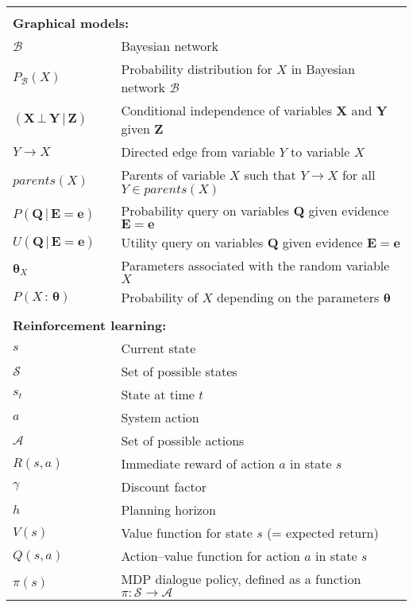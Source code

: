 \begin{longtable}{lp{5mm}p{11cm}}
&&  \vspace{0mm} \\
\multicolumn{3}{l}{\textbf{Graphical models:}} \vspace{2mm} \\
 $\mathcal{B}$ && Bayesian network \\
 $P_\mathcal{B}(X)$ && Probability distribution for $X$ in Bayesian network $\mathcal{B}$ \\ 
$(\mathbf{X} \, \bot \, \mathbf{Y} \, | \, \mathbf{Z})$ && Conditional independence of variables $\mathbf{X} $ and $\mathbf{Y}$ given $\mathbf{Z}$ \\
$Y \rightarrow X$ && Directed edge from variable $Y$ to variable $X$ \\
$parents(X)$ && Parents of variable $X$ such that $Y \rightarrow X$ for all $Y\!\in\!parents(X)$ \\
 $P(\mathbf{Q}  \, | \,  \mathbf{E}\!=\!\mathbf{e})$ && Probability query on variables $\mathbf{Q}$ given evidence $\mathbf{E}\!=\!\mathbf{e}$ \\ 
 $U(\mathbf{Q}  \, | \,  \mathbf{E}\!=\!\mathbf{e})$ && Utility query on variables $\mathbf{Q}$ given evidence $\mathbf{E}\!=\!\mathbf{e}$ \\ 
 $\boldsymbol\theta_{X}$ && Parameters associated with the random variable $X$ \\ 
 $P(X \, : \, \boldsymbol\theta)$ && Probability of $X$ depending on the parameters $\boldsymbol\theta$ \\ 
&&  \vspace{0mm} \\
\multicolumn{3}{l}{\textbf{Reinforcement learning:}} \vspace{2mm} \\
$s$ && Current state \\
$\mathcal{S}$ && Set of possible states \\
$s_t$ && State at time $t$ \\
$a$ && System action \\ 
$\mathcal{A}$ && Set of possible actions \\
$R(s,a)$ && Immediate reward of action $a$ in state $s$ \\
$\gamma$ && Discount factor \\
$h$ && Planning horizon \\
$V(s)$ && Value function for state $s$ (= expected return) \\
$Q(s,a)$ && Action--value function for action $a$ in state $s$  \\
$\pi(s)$ && MDP dialogue policy, defined as a function $\pi: \mathcal{S} \rightarrow \mathcal{A} $ \\

\end{longtable}

